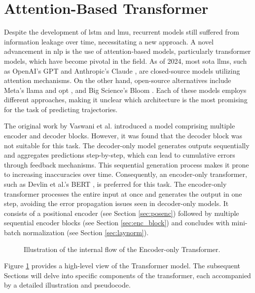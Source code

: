 \section{Attention-Based Transformer}
\label{sect:trafo}
Despite the development of \gls{lstm} and \gls{lmu}, recurrent models still suffered from information leakage over time, necessitating a new approach. A novel advancement in \gls{nlp} is the use of attention-based models, particularly transformer models, which have become pivotal in the field. As of 2024, most \gls{sota} \glspl{llm}, such as OpenAI's GPT \cite{gpt} and Anthropic's Claude \cite{claude}, are closed-source models utilizing attention mechanisms. On the other hand, open-source alternatives include Meta's \gls{llama} \cite{llama} and \gls{opt} \cite{opt}, and Big Science's Bloom \cite{bloom}. Each of these models employs different approaches, making it unclear which architecture is the most promising for the task of predicting trajectories.

The original work by Vaswani et al. \cite{transformer} introduced a model comprising multiple encoder and decoder blocks. However, it was found that the decoder block was not suitable for this task. The decoder-only model generates outputs sequentially and aggregates predictions step-by-step, which can lead to cumulative errors through feedback mechanisms. This sequential generation process makes it prone to increasing inaccuracies over time. Consequently, an encoder-only transformer, such as Devlin et al.'s BERT \cite{bert}, is preferred for this task. The encoder-only transformer processes the entire input at once and generates the output in one step, avoiding the error propagation issues seen in decoder-only models. It consists of a positional encoder (see Section \ref{sec:posenc}) followed by multiple sequential encoder blocks (see Section \ref{sec:enc_block}) and concludes with mini-batch normalization (see Section \ref{sec:laynorm}).

\begin{figure}[b]
    \centering
    
    \caption{Illustration of the internal flow of the Encoder-only Transformer.}
    \label{fig:transformer}
\end{figure}

Figure \ref{fig:transformer} provides a high-level view of the Transformer model. The subsequent Sections will delve into specific components of the transformer, each accompanied by a detailed illustration and pseudocode.

